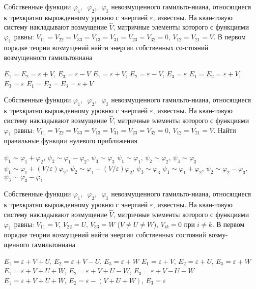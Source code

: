 \documentclass[11pt,a4paper]{exam}
\begin{document}
\begin{questions}
\question Собственные функции ${\varphi _1},\;\;{\varphi _2},\;\;{\varphi _3}$ невозмущенного гамильто-ниана, относящиеся к трехкратно вырожденному уровню с энергией $\varepsilon $, известны. На кван-товую систему накладывают возмущение $\hat V$, матричные элементы которого с функциями ${\varphi _{i\;}}$ равны: ${V_{11}} = {V_{22}} = {V_{33}} = {V_{13}} = {V_{31}} = {V_{23}} = {V_{32}} = 0$, ${V_{12}} = {V_{21}} = V$. В первом порядке теории возмущений найти энергии собственных со-стояний возмущенного гамильтониана
\begin{choices}
\choice ${E_1} = {E_2} = \varepsilon  + V$, ${E_3} = \varepsilon  - V$    
\choice ${E_1} = \varepsilon  + V$, ${E_2} = \varepsilon  - V$, ${E_3} = \varepsilon $
\choice ${E_1} = {E_2} = \varepsilon  + V$, ${E_3} = \varepsilon $        
\choice ${E_1} = {E_2} = {E_3} = \varepsilon  + V$
\end{choices}

\question Собственные функции ${\varphi _1},\;\;{\varphi _2},\;\;{\varphi _3}$ невозмущенного гамильто-ниана, относящиеся к трехкратно вырожденному уровню с энергией $\varepsilon $, известны. На кван-товую систему накладывают возмущение $\hat V$, матричные элементы которого с функциями ${\varphi _{i\;}}$ равны: ${V_{11}} = {V_{22}} = {V_{33}} = {V_{13}} = {V_{31}} = {V_{23}} = {V_{32}} = 0$, ${V_{12}} = {V_{21}} = V$. Найти правильные функции нулевого приближения
\begin{choices}
\choice ${\psi _1} \sim {\varphi _1} + {\varphi _2}$, ${\psi _2} \sim {\varphi _1} - {\varphi _2}$, ${\psi _3} \sim {\varphi _3}$        
\choice ${\psi _1} \sim {\varphi _1}$, ${\psi _2} \sim {\varphi _2}$, ${\psi _3} \sim {\varphi _3}$
\choice ${\psi _1} \sim {\varphi _1} + \left( {V/\varepsilon } \right){\varphi _2}$, ${\psi _2} \sim {\varphi _1} - \left( {V/\varepsilon } \right){\varphi _2}$, ${\psi _3} \sim {\varphi _3}$      
\choice ${\psi _1} \sim {\varphi _1} + {\varphi _2}$, ${\psi _2} \sim {\varphi _2} - {\varphi _3}$, ${\psi _3} \sim {\varphi _3} - {\varphi _1}$
\end{choices}

\question Собственные функции ${\varphi _1},\;\;{\varphi _2},\;\;{\varphi _3}$ невозмущенного гамильто-ниана, относящиеся к трехкратно вырожденному уровню с энергией $\varepsilon $, известны. На кван-товую систему накладывают возмущение $\hat V$, матричные элементы которого с функциями ${\varphi _{i\;}}$ равны: ${V_{11}} = V$, ${V_{22}} = U$, ${V_{33}} = W$ ($V \ne U \ne W$), ${V_{ik}} = 0$ при $i \ne k$. В первом порядке теории возмущений найти энергии собственных состояний возму-щенного гамильтониана
\begin{choices}
\choice ${E_1} = \varepsilon  + V + U$, ${E_2} = \varepsilon  + V - U$, ${E_3} = \varepsilon  + W$   
\choice ${E_1} = \varepsilon  + V$, ${E_2} = \varepsilon  + U$, ${E_3} = \varepsilon  + W$  
\choice ${E_1} = \varepsilon  + V + U + W$, ${E_2} = \varepsilon  + V + U - W$, ${E_3} = \varepsilon  + V - U - W$
\choice ${E_1} = \varepsilon  + V + U + W$, ${E_2} = \varepsilon  - (V + U + W)$, ${E_3} = \varepsilon $
\end{choices}


\end{questions}
\end{document}
